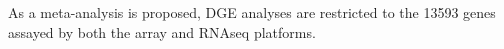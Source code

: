 As a meta-analysis is proposed, \gls{DGE} analyses are restricted to the 13593 genes assayed by both the array and \gls{RNAseq} platforms.
%

